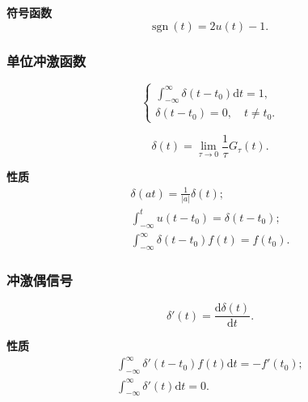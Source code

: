 \textbf{符号函数}
\begin{equation}
    \mathrm{sgn}\ (t)=2u(t)-1.
\end{equation}

\subsubsection{单位冲激函数}

\rmg
\begin{equation}
    \begin{cases}
        \displaystyle\int_{-\infty}^{\infty}\delta(t-t_0)\mathrm{d}t=1, \\
        \delta(t-t_0)=0,\quad t\neq t_0.
    \end{cases}
\end{equation}

\begin{equation}
    \delta(t)=\lim_{\tau\rightarrow 0}\frac{1}{\tau}G_\tau(t).
\end{equation}

\textbf{性质}
\begin{gather}
    \delta(at)=\frac{1}{|a|}\delta(t); \\
    \int_{-\infty}^{t}u(t-t_0)=\delta(t-t_0); \\
    \int_{-\infty}^{\infty}\delta(t-t_0)f(t)=f(t_0).
\end{gather}

\subsubsection{冲激偶信号}

\rmg
\begin{equation}
    \delta'(t)=\frac{\mathrm{d}\delta(t)}{\mathrm{d}t}.
\end{equation}

\textbf{性质}
\begin{gather}
    \int_{-\infty}^{\infty}\delta'(t-t_0)f(t)\mathrm{d}t=-f'(t_0); \\
    \int_{-\infty}^{\infty}\delta'(t)\mathrm{d}t=0.
\end{gather}

